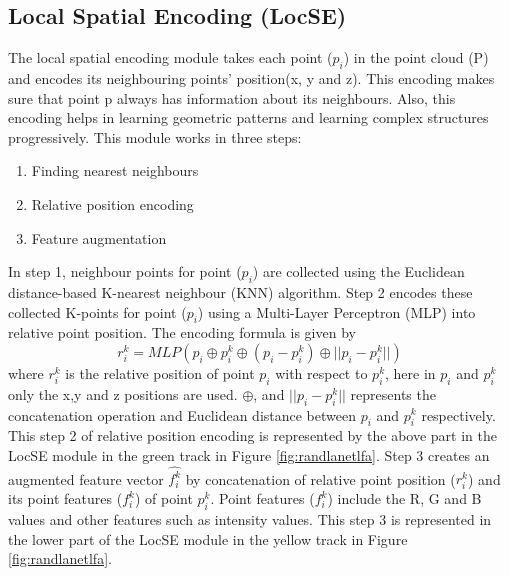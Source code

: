 \subsection{Local Spatial Encoding (LocSE)}
The local spatial encoding module takes each point ($p_i$) in the point cloud (P) and encodes its neighbouring points' position(x, y and z).
This encoding makes sure that point p always has information about its neighbours.
Also, this encoding helps in learning geometric patterns and learning complex structures progressively.
This module works in three steps:
\begin{enumerate}
    \item Finding nearest neighbours
    \item Relative position encoding
    \item Feature augmentation
\end{enumerate}

In step 1, neighbour points for point ($p_i$) are collected using the Euclidean distance-based K-nearest neighbour (KNN) algorithm.
Step 2 encodes these collected K-points for point ($p_i$) using a Multi-Layer Perceptron (MLP) into relative point position. The encoding formula is given by
$$
r_i^k = MLP(p_i \oplus p_i^k \oplus (p_i - p_i^k) \oplus ||p_i-p_i^k||)
$$
where $r_i^k$ is the relative position of point $p_i$ with respect to $p_i^k$, here in $p_i$ and $p_i^k$ only the x,y and z positions are used.
$\oplus$, and $||p_i-p_i^k||$ represents the concatenation operation and Euclidean distance between $p_i$ and $p_i^k$ respectively.
This step 2 of relative position encoding is represented by the above part in the LocSE module in the green track in Figure \ref{fig:randlanetlfa}.
Step 3 creates an augmented feature vector $\hat{f_i^k}$ by concatenation of relative point position ($r_i^k$) and its point features ($f_i^k$) of point $p_i^k$.
Point features ($f_i^k$) include the R, G and B values and other features such as intensity values.
This step 3 is represented in the lower part of the LocSE module in the yellow track in Figure \ref{fig:randlanetlfa}.
